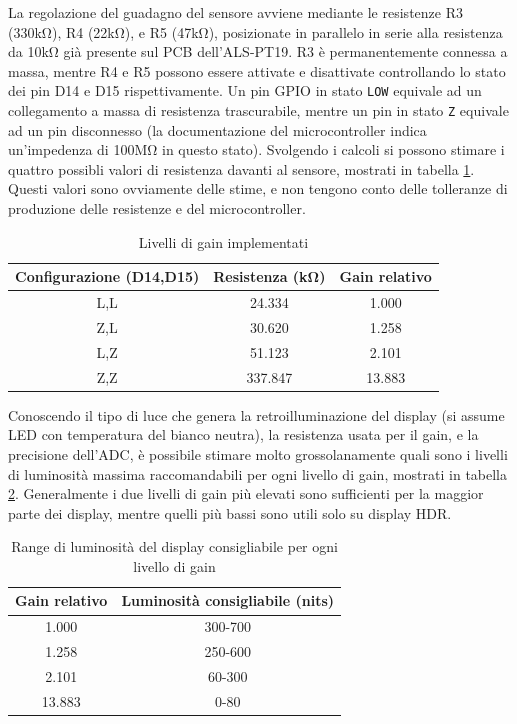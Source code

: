 La regolazione del guadagno del sensore avviene mediante le resistenze R3 (330k\si{\ohm}), R4 (22k\si{\ohm}), e R5 (47k\si{\ohm}), posizionate in parallelo in serie alla resistenza da 10k\si{\ohm} già presente sul PCB dell'ALS-PT19. R3 è permanentemente connessa a massa, mentre R4 e R5 possono essere attivate e disattivate controllando lo stato dei pin D14 e D15 rispettivamente. Un pin GPIO in stato \texttt{LOW} equivale ad un collegamento a massa di resistenza trascurabile, mentre un pin in stato \texttt{Z} equivale ad un pin disconnesso (la documentazione del microcontroller indica un'impedenza di 100M\si{\ohm} in questo stato). Svolgendo i calcoli si possono stimare i quattro possibli valori di resistenza davanti al sensore, mostrati in tabella \ref{tab:pt19_gains}. Questi valori sono ovviamente delle stime, e non tengono conto delle tolleranze di produzione delle resistenze e del microcontroller.
\begin{table}
	\centering
	\begin{tabular}{|c|c|c|} 
		\hline
		\textbf{Configurazione (D14,D15)} & \textbf{Resistenza (k\si{\ohm})} & \textbf{Gain relativo}  \\ 
		\hline
		L,L & 24.334   & 1.000         \\ 
		\hline
		Z,L & 30.620   & 1.258         \\ 
		\hline
		L,Z & 51.123   & 2.101         \\ 
		\hline
		Z,Z & 337.847    & 13.883          \\
		\hline
	\end{tabular}
	\caption{\label{tab:pt19_gains}Livelli di gain implementati}
\end{table}

Conoscendo il tipo di luce che genera la retroilluminazione del display (si assume LED con temperatura del bianco neutra), la resistenza usata per il gain, e la precisione dell'ADC, è possibile stimare molto grossolanamente quali sono i livelli di luminosità massima raccomandabili per ogni livello di gain, mostrati in tabella \ref{tab:pt19_nits}. Generalmente i due livelli di gain più elevati sono sufficienti per la maggior parte dei display, mentre quelli più bassi sono utili solo su display HDR.
\begin{table}
	\centering
	\begin{tabular}{|c|c|} 
		\hline
		\textbf{Gain relativo} & \textbf{Luminosità consigliabile (nits)}  \\ 
		\hline
		1.000 & 300-700         \\ 
		\hline
		1.258 & 250-600         \\ 
		\hline
		2.101 & 60-300         \\ 
		\hline
		13.883 & 0-80          \\
		\hline
	\end{tabular}
	\caption{\label{tab:pt19_nits}Range di luminosità del display consigliabile per ogni livello di gain}
\end{table}


